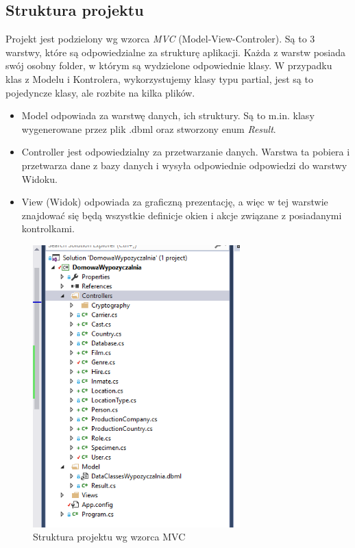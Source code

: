 \documentclass{article}
\begin{document}
\subsection{Struktura projektu}
Projekt jest podzielony wg wzorca \textit{MVC} (Model-View-Controler). Są to 3 warstwy, które są odpowiedzialne za strukturę aplikacji. Każda z warstw posiada swój osobny folder, w którym są wydzielone odpowiednie klasy. W przypadku klas z Modelu i Kontrolera, wykorzystujemy klasy typu partial, jest są to pojedyncze klasy, ale rozbite na kilka plików. 
\begin{itemize}
\item Model odpowiada za warstwę danych, ich struktury. Są to m.in. klasy wygenerowane przez plik .dbml oraz stworzony enum \textit{Result}.
\item Controller jest odpowiedzialny za przetwarzanie danych. Warstwa ta pobiera i przetwarza dane z bazy danych i wysyła odpowiednie odpowiedzi do warstwy Widoku.
\item View (Widok) odpowiada za graficzną prezentację, a więc w tej warstwie znajdować się będą wszystkie definicje okien i akcje związane z posiadanymi kontrolkami.
\end{itemize}
\newpage
\begin{figure}[!ht]
\centering
\includegraphics[width=8cm]{mvc.PNG}
\caption{Struktura projektu wg wzorca MVC}
\end{figure}
\end{document}
